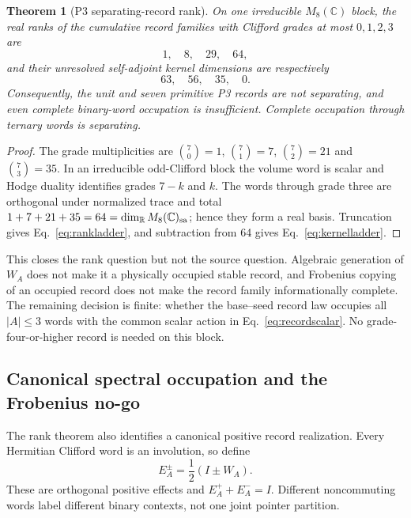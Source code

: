 \documentclass[11pt]{article}
\newtheorem{theorem}{Theorem}
\begin{document}
\begin{theorem}[P3 separating-record rank]
\label{thm:p3rank}
On one irreducible $M_8(\mathbb C)$ block, the real ranks of the cumulative
record families with Clifford grades at most $0,1,2,3$ are
\begin{equation}
 \boxed{1,\quad8,\quad29,\quad64},
 \label{eq:rankladder}
\end{equation}
and their unresolved self-adjoint kernel dimensions are respectively
\begin{equation}
 \boxed{63,\quad56,\quad35,\quad0}.
 \label{eq:kernelladder}
\end{equation}
Consequently, the unit and seven primitive P3 records are not separating, and
even complete binary-word occupation is insufficient. Complete occupation
through ternary words is separating.
\end{theorem}

\begin{proof}
The grade multiplicities are $\binom70=1$, $\binom71=7$,
$\binom72=21$ and $\binom73=35$. In an irreducible odd-Clifford block the
volume word is scalar and Hodge duality identifies grades $7-k$ and $k$.
The words through grade three are orthogonal under normalized trace and total
$1+7+21+35=64=\dim_{\mathbb R}M_8(\mathbb C)_{\rm sa}$; hence they form a
real basis. Truncation gives Eq.~\eqref{eq:rankladder}, and subtraction from
64 gives Eq.~\eqref{eq:kernelladder}.
\end{proof}

This closes the rank question but not the source question. Algebraic
generation of $W_A$ does not make it a physically occupied stable record, and
Frobenius copying of an occupied record does not make the record family
informationally complete. The remaining decision is finite: whether the
base--seed record law occupies all $|A|\leq3$ words with the common scalar
action in Eq.~\eqref{eq:recordscalar}. No grade-four-or-higher record is
needed on this block.

\subsection{Canonical spectral occupation and the Frobenius no-go}

The rank theorem also identifies a canonical positive record realization.
Every Hermitian Clifford word is an involution, so define
\begin{equation}
 E_A^\pm=\frac12(I\pm W_A).
 \label{eq:spectraleffects}
\end{equation}
These are orthogonal positive effects and $E_A^++E_A^-=I$. Different
noncommuting words label different binary contexts, not one joint pointer
partition.
\end{document}
